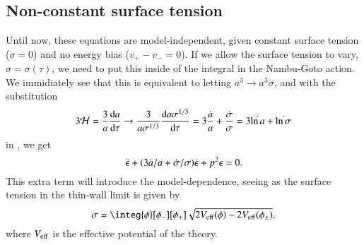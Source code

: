 \subsection{Non-constant surface tension}
    Until now, these equations are model-independent, given constant surface tension ($\dot{\sigma}= 0$) and no energy bias ($v_+ - v_- = 0$). 
    If we allow the surface tension to vary, $\sigma=\sigma(\tau)$, %
    we need to put this inside of the integral in the Nambu-Goto action. We immidiately see that this is equivalent to letting $a^3\to a^3 \sigma$, and with the substitution 
    \begin{equation}
        3\mathcal{H} =  \frac{3}{a} \dv{a}{\tau} \to \frac{3}{a\sigma^{1/3}} \dv{a\sigma^{1/3}}{\tau} =  3\frac{\dot{a}}{a} +  \frac{\dot{\sigma}}{\sigma} = 3\dot{\ln{a}} + \dot{\ln{\sigma}}
    \end{equation}
    in , we get
    \begin{equation}
        \ddot{\epsilon} + {\left( 3\dot{a}/a + \dot{\sigma}/\sigma \right)}\dot{\epsilon} +p^2 \epsilon = 0.
    \end{equation}
    This extra term will introduce the model-dependence, seeing as the surface tension in the thin-wall limit is given by
    \begin{equation}
        \sigma = \integ{\phi}[\phi_-][\phi_+] \sqrt{ 2V\ped{eff}(\phi)-2V\ped{eff}(\phi_\pm) },
    \end{equation}
    where $V_\mathrm{eff}$ is the effective potential of the theory. 

